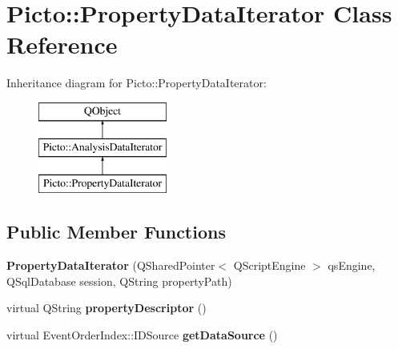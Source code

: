 \hypertarget{class_picto_1_1_property_data_iterator}{\section{Picto\-:\-:Property\-Data\-Iterator Class Reference}
\label{class_picto_1_1_property_data_iterator}
}
Inheritance diagram for Picto\-:\-:Property\-Data\-Iterator\-:\begin{figure}[H]
\begin{center}
\leavevmode
\includegraphics[height=3.000000cm]{class_picto_1_1_property_data_iterator}
\end{center}
\end{figure}
\subsection*{Public Member Functions}
\begin{DoxyCompactItemize}
\item 
\hypertarget{class_picto_1_1_property_data_iterator_a28701b075404ee91b383d3e405c39b44}{{\bfseries Property\-Data\-Iterator} (Q\-Shared\-Pointer$<$ Q\-Script\-Engine $>$ qs\-Engine, Q\-Sql\-Database session, Q\-String property\-Path)}\label{class_picto_1_1_property_data_iterator_a28701b075404ee91b383d3e405c39b44}

\item 
\hypertarget{class_picto_1_1_property_data_iterator_abeaee78db2d0278ecb9fb6c10c45b6a3}{virtual Q\-String {\bfseries property\-Descriptor} ()}\label{class_picto_1_1_property_data_iterator_abeaee78db2d0278ecb9fb6c10c45b6a3}

\item 
\hypertarget{class_picto_1_1_property_data_iterator_a035b55d757c9d9ddc86c0c883109d294}{virtual Event\-Order\-Index\-::\-I\-D\-Source {\bfseries get\-Data\-Source} ()}\label{class_picto_1_1_property_data_iterator_a035b55d757c9d9ddc86c0c883109d294}

\end{DoxyCompactItemize}
